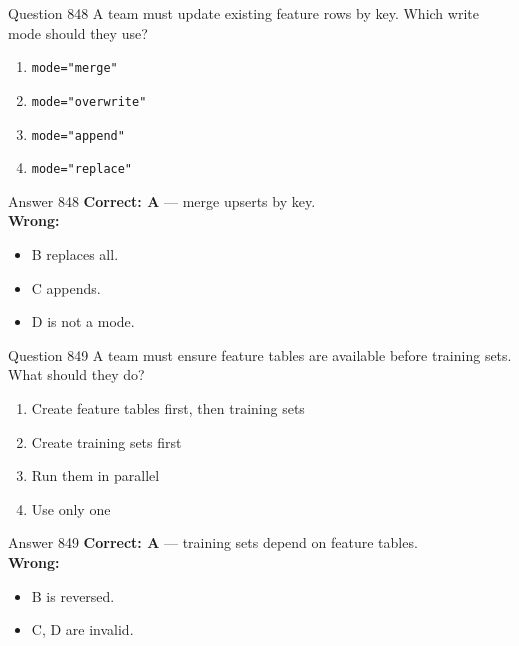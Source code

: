 \documentclass[aspectratio=169,11pt]{beamer}
\begin{document}
	\begin{frame}{Question 848}
		A team must update existing feature rows by key. Which write mode should they use?
		\begin{enumerate}[label=\Alph*.]
			\item \texttt{mode="merge"}
			\item \texttt{mode="overwrite"}
			\item \texttt{mode="append"}
			\item \texttt{mode="replace"}
		\end{enumerate}
	\end{frame}
	\begin{frame}{Answer 848}
		\textbf{Correct: A} --- merge upserts by key.\\
		\vspace{0.5em}
		\textbf{Wrong:}
		\begin{itemize}
			\item B replaces all.
			\item C appends.
			\item D is not a mode.
		\end{itemize}
	\end{frame}
	
	\begin{frame}{Question 849}
		A team must ensure feature tables are available before training sets. What should they do?
		\begin{enumerate}[label=\Alph*.]
			\item Create feature tables first, then training sets
			\item Create training sets first
			\item Run them in parallel
			\item Use only one
		\end{enumerate}
	\end{frame}
	\begin{frame}{Answer 849}
		\textbf{Correct: A} --- training sets depend on feature tables.\\
		\vspace{0.5em}
		\textbf{Wrong:}
		\begin{itemize}
			\item B is reversed.
			\item C, D are invalid.
		\end{itemize}
	\end{frame}
	
\end{document}
